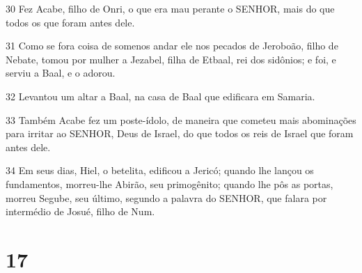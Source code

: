\par 30 Fez Acabe, filho de Onri, o que era mau perante o SENHOR, mais do que todos os que foram antes dele.
\par 31 Como se fora coisa de somenos andar ele nos pecados de Jeroboão, filho de Nebate, tomou por mulher a Jezabel, filha de Etbaal, rei dos sidônios; e foi, e serviu a Baal, e o adorou.
\par 32 Levantou um altar a Baal, na casa de Baal que edificara em Samaria.
\par 33 Também Acabe fez um poste-ídolo, de maneira que cometeu mais abominações para irritar ao SENHOR, Deus de Israel, do que todos os reis de Israel que foram antes dele.
\par 34 Em seus dias, Hiel, o betelita, edificou a Jericó; quando lhe lançou os fundamentos, morreu-lhe Abirão, seu primogênito; quando lhe pôs as portas, morreu Segube, seu último, segundo a palavra do SENHOR, que falara por intermédio de Josué, filho de Num.

\chapter{17}

